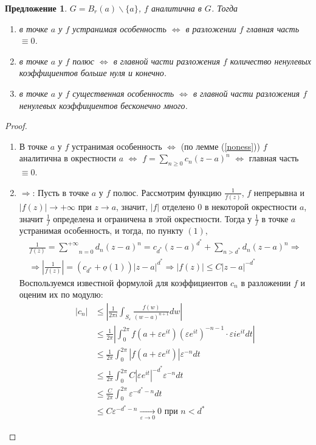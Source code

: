 \documentclass[12pt]{article}
\newcommand{\Ra}{\Rightarrow}
\renewcommand{\iff}{\Leftrightarrow}
\newcounter{cnt}
\theoremstyle{thmnote}
\newtheorem{proposition}[cnt]{Предложение}
\theoremstyle{remark}
\theoremstyle{defnote}
\begin{document}
\begin{proposition}
    $G = B_r(a) \backslash \{a\}$, $f$ аналитична в $G$. Тогда
    \begin{enumerate}
        \item в точке $a$ у $f$ устранимая особенность $\iff$ в разложении $f$ главная часть $\equiv 0$.
        \item в точке $a$ у $f$ полюс $\iff$ в главной части разложения $f$ количество ненулевых коэффициентов больше нуля и конечно.
        \item в точке $a$ у $f$ существенная особенность $\iff$ в главной части разложения $f$ ненулевых коэффициентов бесконечно много.
    \end{enumerate}
\end{proposition}
\begin{proof}
    \begin{enumerate}
        \item В точке $a$ у $f$ устранимая особенность $\iff$ (по лемме (\ref{noness})) $f$ аналитична в окрестности $a$ $\iff$ $f = \sum_{n\geq 0} c_n (z - a)^n$ $\iff$ главная часть $\equiv 0$.
        \item $\Ra$: Пусть в точке $a$ у $f$ полюс. Рассмотрим функцию $\frac{1}{f(z)}$, $f$ непрерывна и $|f(z)| \to +\infty$ при $z \to a$, значит, $|f|$ отделено 0 в некоторой окрестности $a$, значит $\frac{1}{f}$ определена и ограничена в этой окрестности. Тогда у $\frac{1}{f}$ в точке $a$ устранимая особенность, и тогда, по пункту $(1)$, \begin{gather*}
            \frac{1}{f(z)} = \underset{n=0}{\overset{+\infty}{\sum}} d_n (z - a)^n = c_{d^*} (z - a)^{d^*} + \underset{n > d^*}{\sum} d_n (z - a)^n \Ra \\ 
            \Ra \left| \frac{1}{f(z)} \right| = (c_{d^*} + \underline{o}(1)) |z - a|^{d^*} \Ra |f(z)| \leq C|z - a|^{-d^*}
        \end{gather*}
        Воспользуемся известной формулой для коэффициентов $c_n$ в разложении $f$ и оценим их по модулю:
        \begin{align*}
            |c_n| &\leq \left|\frac{1}{2 \pi i} \int_{S_{\varepsilon}} \frac{f(w)}{(w - a)^{n+1}} dw \right| \\
            &\leq \frac{1}{2 \pi} \left|\int_{0}^{2 \pi} f(a + \varepsilon e^{it}) (\varepsilon e^{it})^{-n-1} \cdot \varepsilon i e^{it} dt\right| \\
            &\leq \frac{1}{2 \pi} \int_{0}^{2 \pi} |f(a + \varepsilon e^{it})| \varepsilon^{-n} dt \\
            &\leq \frac{1}{2 \pi} \int_{0}^{2 \pi} C |\varepsilon e^{it}|^{-d^*} \varepsilon^{-n} dt \\
            &\leq \frac{C}{2 \pi} \int_{0}^{2 \pi} \varepsilon^{-d^* - n} dt \\
            &\leq C \varepsilon^{-d^* - n} \underset{\varepsilon \to 0}{\longrightarrow} 0 \text{ при } n < d^*
        \end{align*}


\end{enumerate}
\end{proof}
\end{document}
